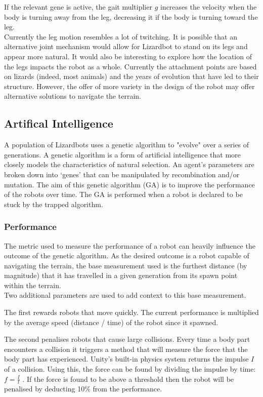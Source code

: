 \documentclass{article}
\begin{document}
If the relevant gene is active, the gait multiplier $g$ increases the velocity when the body is turning away from the leg, decreasing it if the body is turning toward the leg.\\

Currently the leg motion resembles a lot of twitching. It is possible that an alternative joint mechanism would allow for Lizardbot to stand on its legs and appear more natural. It would also be interesting to explore how the location of the legs impacts the robot as a whole. Currently the attachment points are based on lizards (indeed, most animals) and the years of evolution that have led to their structure. However, the offer of more variety in the design of the robot may offer alternative solutions to navigate the terrain. 


\subsection{Artifical Intelligence}
\label{sec:AI Imp}
A population of Lizardbots uses a genetic algorithm to "evolve" over a series of generations. A genetic algorithm is a form of artificial intelligence that more closely models the characteristics of natural selection. An agent’s parameters are broken down into ‘genes’ that can be manipulated by recombination and/or mutation. The aim of this genetic algorithm (GA) is to improve the performance of the robots over time. The GA is performed when a robot is declared to be stuck by the trapped algorithm. 

\subsubsection{Performance}
\label{sec:Performance Imp}
The metric used to measure the performance of a robot can heavily influence the outcome of the genetic algorithm. As the desired outcome is a robot capable of navigating the terrain, the base measurement used is the furthest distance (by magnitude) that it has travelled in a given generation from its spawn point within the terrain. 
\\[1\baselineskip]
Two additional parameters are used to add context to this base measurement. 

The first rewards robots that move quickly. The current performance is multiplied by the average speed (distance / time) of the robot since it spawned.

The second penalises robots that cause large collisions. Every time a body part encounters a collision it triggers a method that will measure the force that the body part has experienced. Unity's built-in physics system returns the impulse $I$ of a collision. Using this, the force can be found by dividing the impulse by time: {\Large $f = \frac{I}{t}$} .
If the force is found to be above a threshold then the robot will be penalised by deducting 10\% from the performance. 
\end{document}
